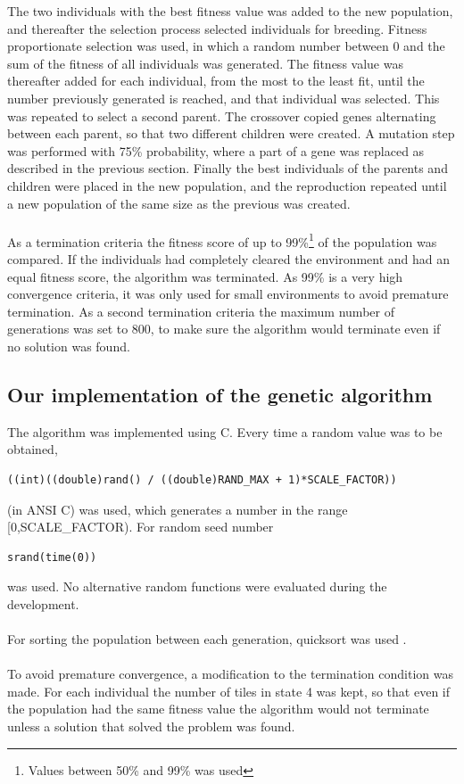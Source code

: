The two individuals with the best fitness value was added to the new population, and thereafter the selection process selected individuals for breeding. Fitness proportionate selection was used, in which a random number between 0 and the sum of the fitness of all individuals was generated. The fitness value was thereafter added for each individual, from the most to the least fit, until the number previously generated is reached, and that individual was selected. This was repeated to select a second parent. The crossover copied genes alternating between each parent, so that two different children were created. A mutation step was performed with 75\% probability, where a part of a gene was replaced as described in the previous section. Finally the best individuals of the parents and children were  placed in the new population, and the reproduction repeated until a new population of the same size as the previous was created.\\\\
As a termination criteria the fitness score of up to 99\%\footnote{Values between 50\% and 99\% was used} of the population was compared. If the individuals had completely cleared the environment and had an equal fitness score, the algorithm was terminated. As 99\% is a very high convergence criteria, it was only used for small environments to avoid premature termination. As a second termination criteria the maximum number of generations was set to 800, to make sure the algorithm would terminate even if no solution was found.
\subsection{Our implementation of the genetic algorithm}
The algorithm was implemented using C. Every time a random value was to be obtained,
\begin{verbatim}
((int)((double)rand() / ((double)RAND_MAX + 1)*SCALE_FACTOR))
\end{verbatim}
(in ANSI C) was used, which generates a number in the range [0,SCALE\_FACTOR). For random seed number 
\begin{verbatim}
srand(time(0))
\end{verbatim}
was used. No alternative random functions were evaluated during the development.\\\\
For sorting the population between each generation, quicksort was used \cite{quicksort}.\\\\
To avoid premature convergence, a modification to the termination condition was made. For each individual the number of tiles in state 4 was kept, so that even if the population had the same fitness value the algorithm would not terminate unless a solution that solved the problem was found.
\newpage